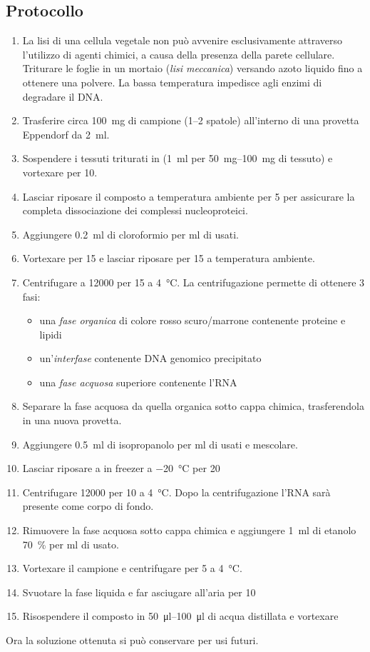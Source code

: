 \subsection{Protocollo}
\begin{enumerate}
	\item La lisi di una cellula vegetale non può avvenire esclusivamente attraverso l’utilizzo di agenti chimici, a causa della presenza della parete cellulare. Triturare le foglie in un mortaio (\textit{lisi meccanica}) versando azoto liquido fino a ottenere una polvere. La bassa temperatura impedisce agli enzimi di degradare il DNA.
	\item Trasferire circa \qty{100}{\mg} di campione (\numrange{1}{2} spatole) all’interno di una provetta \foreignlanguage{german}{Eppendorf} da \qty{2}{\ml}.
	\item Sospendere i tessuti triturati in \trizol (\qty{1}{ml} per \qtyrange{50}{100}{\mg} di tessuto) e vortexare per \qty{10}{\sec}.
	\item Lasciar riposare il composto a temperatura ambiente per \qty{5}{\min} per assicurare la completa dissociazione dei complessi nucleoproteici.
	\item Aggiungere \qty{0.2}{\ml} di cloroformio per ml di \trizol usati.
	\item Vortexare per \qty{15}{\sec} e lasciar riposare per \qty{15}{\min} a temperatura ambiente.
	\item Centrifugare a \qty{12000}{\giri} per \qty{15}{\min} a \qty{4}{\celsius}. La centrifugazione permette di ottenere 3 fasi: 
	\begin{itemize}
		\item una \emph{fase organica} di colore rosso scuro/marrone contenente proteine e lipidi
		\item un’\emph{interfase} contenente DNA genomico precipitato
		\item una \emph{fase acquosa} superiore contenente l’RNA
	\end{itemize}
	\item Separare la fase acquosa da quella organica sotto cappa chimica, trasferendola in una nuova provetta.
	\item Aggiungere \qty{0.5}{ml} di isopropanolo per \unit{\ml} di \trizol usati e mescolare.
	\item Lasciar riposare a in freezer a \qty{-20}{\celsius} per \qty{20}{\min}
	\item Centrifugare \qty{12000}{\giri} per \qty{10}{\min} a \qty{4}{\celsius}. Dopo la centrifugazione l’RNA sarà presente come corpo di fondo.
	\item Rimuovere la fase acquosa sotto cappa chimica e aggiungere \qty{1}{ml} di etanolo \qty{70}{\percent} per \unit{\ml} di \trizol usato.
	\item Vortexare il campione e centrifugare per \qty{5}{\min} a \qty{4}{\celsius}.
	\item Svuotare la fase liquida e far asciugare all’aria per \qty{10}{\min}
	\item Risospendere il composto in \qtyrange{50}{100}{\micro\litre} di acqua distillata e vortexare	
\end{enumerate}
Ora la soluzione ottenuta si può conservare per usi futuri.

